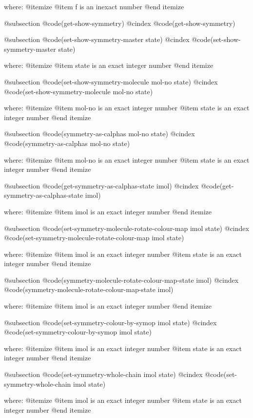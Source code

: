 where: 
 @itemize 
     @item f is an inexact number
 @end itemize


@subsection @code{(get-show-symmetry)}
@cindex @code{(get-show-symmetry)}
 
@subsection @code{(set-show-symmetry-master state)}
@cindex @code{(set-show-symmetry-master state)}
 
where: 
 @itemize 
     @item state is an exact integer number
 @end itemize


@subsection @code{(set-show-symmetry-molecule mol-no state)}
@cindex @code{(set-show-symmetry-molecule mol-no state)}
 
where: 
 @itemize 
     @item mol-no is an exact integer number
     @item state is an exact integer number
 @end itemize


@subsection @code{(symmetry-as-calphas mol-no state)}
@cindex @code{(symmetry-as-calphas mol-no state)}
 
where: 
 @itemize 
     @item mol-no is an exact integer number
     @item state is an exact integer number
 @end itemize


@subsection @code{(get-symmetry-as-calphas-state imol)}
@cindex @code{(get-symmetry-as-calphas-state imol)}
 
where: 
 @itemize 
     @item imol is an exact integer number
 @end itemize


@subsection @code{(set-symmetry-molecule-rotate-colour-map imol state)}
@cindex @code{(set-symmetry-molecule-rotate-colour-map imol state)}
 
where: 
 @itemize 
     @item imol is an exact integer number
     @item state is an exact integer number
 @end itemize


@subsection @code{(symmetry-molecule-rotate-colour-map-state imol)}
@cindex @code{(symmetry-molecule-rotate-colour-map-state imol)}
 
where: 
 @itemize 
     @item imol is an exact integer number
 @end itemize


@subsection @code{(set-symmetry-colour-by-symop imol state)}
@cindex @code{(set-symmetry-colour-by-symop imol state)}
 
where: 
 @itemize 
     @item imol is an exact integer number
     @item state is an exact integer number
 @end itemize


@subsection @code{(set-symmetry-whole-chain imol state)}
@cindex @code{(set-symmetry-whole-chain imol state)}
 
where: 
 @itemize 
     @item imol is an exact integer number
     @item state is an exact integer number
 @end itemize


